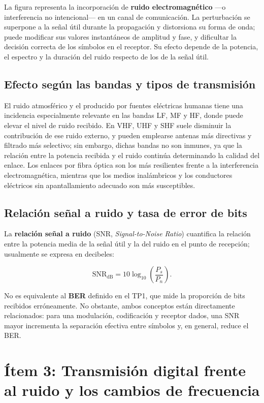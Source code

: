 \documentclass[12pt,a4paper]{article}
\begin{document}
La figura representa la incorporación de \textbf{ruido electromagnético} ---o
interferencia no intencional--- en un canal de comunicación. La perturbación se
superpone a la señal útil durante la propagación y distorsiona su forma de onda;
puede modificar sus valores instantáneos de amplitud y fase, y dificultar la
decisión correcta de los símbolos en el receptor. Su efecto depende de la
potencia, el espectro y la duración del ruido respecto de los de la señal útil.

\subsection{Efecto según las bandas y tipos de transmisión}

El ruido atmosférico y el producido por fuentes eléctricas humanas tiene una
incidencia especialmente relevante en las bandas LF, MF y HF, donde puede elevar
el nivel de ruido recibido. En VHF, UHF y SHF suele disminuir la contribución de
ese ruido externo, y pueden emplearse antenas más directivas y filtrado más
selectivo; sin embargo, dichas bandas no son inmunes, ya que la relación entre
la potencia recibida y el ruido continúa determinando la calidad del enlace.
Los enlaces por fibra óptica son los más resilientes frente a la interferencia
electromagnética, mientras que los medios inalámbricos y los conductores
eléctricos sin apantallamiento adecuado son más susceptibles.

\subsection{Relación señal a ruido y tasa de error de bits}

La \textbf{relación señal a ruido} (SNR, \emph{Signal-to-Noise Ratio}) cuantifica
la relación entre la potencia media de la señal útil y la del ruido en el punto
de recepción; usualmente se expresa en decibeles:

\[
    \mathrm{SNR}_{\mathrm{dB}}=10\log_{10}\left(\frac{P_s}{P_n}\right).
\]

No es equivalente al \textbf{BER} definido en el TP1, que mide la proporción de
bits recibidos erróneamente. No obstante, ambos conceptos están directamente
relacionados: para una modulación, codificación y receptor dados, una SNR mayor
incrementa la separación efectiva entre símbolos y, en general, reduce el BER.


\section{Ítem 3: Transmisión digital frente al ruido y los cambios de frecuencia}
\end{document}
